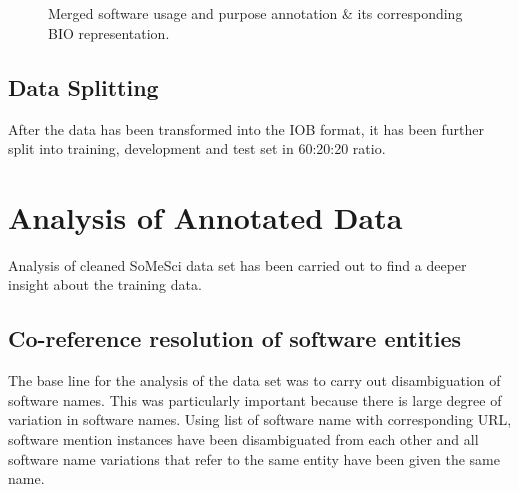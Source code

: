 \begin{figure}[h]
	
	\myfloatalign
	
	 \\
	\\
	\caption{Merged software usage and purpose annotation \& its corresponding BIO representation.}
\end{figure}

\subsection{Data Splitting}
\label{subsec:dataset:preprocessing:Splitting}
After the data has been transformed into the IOB format, it has been further split into training, development and test set in 60:20:20 ratio.


\section{Analysis of Annotated Data}
\label{sec:dataset:Analysis}

Analysis of cleaned SoMeSci data set has been carried out to find a deeper insight about the training data. 

\subsection{Co-reference resolution of software entities }
\label{subsec:dataset:Analysis:resolution}

The base line for the analysis of the data set was to carry out disambiguation of software names. This was particularly important because there is large degree of variation in software names. Using list of software name with corresponding URL, software mention instances have been disambiguated from each other and all software name variations that refer to the same entity have been given the same name. \\


